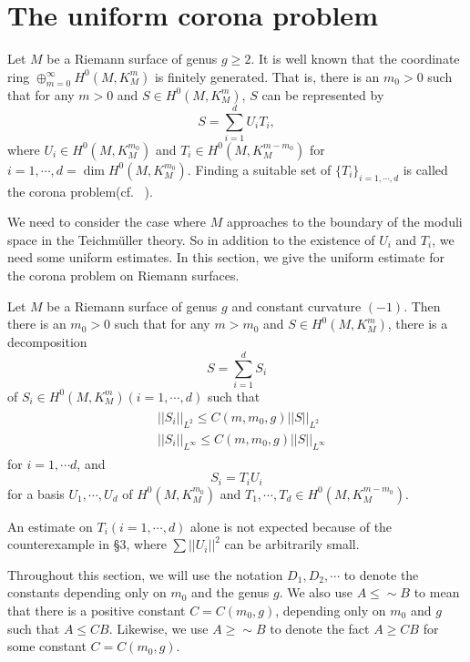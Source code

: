 \section{The uniform corona problem}
Let $M$ be a Riemann surface of genus $g\geq 2$. It is well known 
that the coordinate ring $\oplus_{m=0}^\infty H^0(M,K_M^m)$
is finitely generated. That is, there is an $m_0>0$ such that for any
$m>0$ and $S\in H^0(M,K_M^m)$, $S$ can be represented by
\begin{equation}\label{corona}
S=\sum_{i=1}^{d} U_iT_i,
\end{equation}
where $U_i\in H^0(M,K_M^{m_0})$ and $T_i\in H^0(M,K_M^{m-m_0})$
for $i=1,\cdots, d=\dim H^0(M,K_M^{m_0})$.
Finding a suitable set of $\{T_i\}_{i=1,\cdots,d}$ is called the 
corona problem(cf. ~\cite{JBG}).



We need to consider the case where
$M$ approaches to the boundary of the moduli space
in the Teichm\"uller theory. So
in addition to the existence of $U_i$ and $T_i$, we need some uniform 
estimates. 
In this section, we give the uniform estimate for the corona problem on
Riemann surfaces.


\begin{theorem}\label{5main}
Let $M$ be a Riemann surface 
of genus $g$ and constant curvature $(-1)$.
Then there is an $m_0>0$ such that for any $m>m_0$ and $S\in
H^0(M,K_M^m)$,
there is a decomposition
\[
S=\sum_{i=1}^d S_i
\]
of $S_i\in H^0(M,K_M^m) (i=1,\cdots, d)$
such that
\begin{align}\label{result}
\begin{split}
&||S_i||_{L^2}\leq C(m,m_0,g)||S||_{L^2}\\
&||S_i||_{L^\infty}\leq C(m,m_0,g)||S||_{L^\infty}
\end{split}
\end{align}
for $i=1,\cdots d$,
and 
\[
S_i=T_iU_i
\]
for a basis $U_1,\cdots,U_d$ of $H^0(M,K_M^{m_0})$
and $T_1,\cdots,T_d\in H^0(M,K_M^{m-m_0})$.
\end{theorem}

\begin{rem}
An estimate on $T_i (i=1,\cdots, d)$ alone is not expected because of the
counterexample in \S 3, where $\sum||U_i||^2$ can be arbitrarily small. 
\end{rem}


Throughout this section, we will use the notation $D_1, D_2,\cdots$ to
denote the
constants depending only on $m_0$ and the genus $g$.
We also use $A\leq\sim B$ to mean that there is a
positive constant $C=C(m_0,
g)$,
depending only on $m_0$ and $g$ such that $A\leq CB$. Likewise, we use
$A\geq\sim B$ to denote the fact $A\geq CB$
for some constant $C=C(m_0, g)$.



